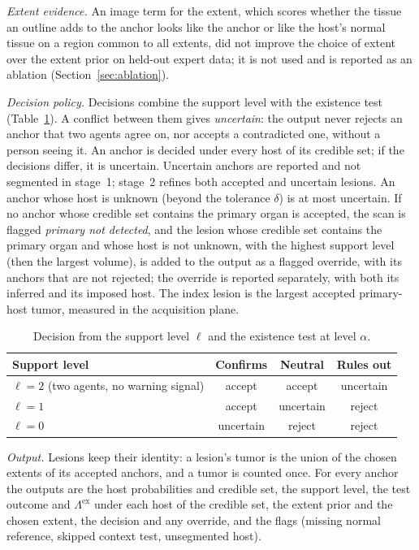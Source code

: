 \documentclass[fleqn,10pt]{olplainarticle}
\begin{document}
\emph{Extent evidence.} An image term for the extent, which scores whether the tissue an outline adds to the anchor
looks like the anchor or like the host's normal tissue on a region common to all extents, did not improve the choice of
extent over the extent prior on held-out expert data; it is not used and is reported as an ablation
(Section~\ref{sec:ablation}).

\emph{Decision policy.} Decisions combine the support level with the existence test (Table~\ref{tab:decision}). A
conflict between them gives \emph{uncertain}: the output never rejects an anchor that two agents agree on, nor accepts a
contradicted one, without a person seeing it. An anchor is decided under every host of its credible set; if the decisions
differ, it is uncertain. Uncertain anchors are reported and not segmented in stage~1; stage~2 refines both accepted and uncertain lesions. An
anchor whose host is unknown (beyond the tolerance $\delta$) is at most uncertain. If no anchor whose credible set
contains the primary organ is accepted, the scan is flagged \emph{primary not detected}, and the lesion whose credible set
contains the primary organ and whose host is not unknown, with the highest support level (then the largest volume), is added to the output as a flagged
override, with its anchors that are not rejected; the override is reported separately, with both its inferred and its
imposed host. The index lesion is the largest accepted primary-host tumor, measured in the acquisition plane.

\begin{table}[t]
\centering\small
\caption{Decision from the support level $\ell$ and the existence test at level $\alpha$.}
\label{tab:decision}
\begin{tabular}{lccc}
\hline
Support level & Confirms & Neutral & Rules out\\
\hline
$\ell=2$ (two agents, no warning signal) & accept & accept & uncertain\\
$\ell=1$ & accept & uncertain & reject\\
$\ell=0$ & uncertain & reject & reject\\
\hline
\end{tabular}
\end{table}

\emph{Output.} Lesions keep their identity: a lesion's tumor is the union of the chosen extents of its accepted anchors, and a
tumor is counted once. For every anchor the outputs are the host probabilities and credible set, the support level, the
test outcome and $\Lambda^{\mathrm{ex}}$ under each host of the credible set, the extent prior and the chosen extent, the
decision and any override, and the flags (missing normal reference, skipped context test, unsegmented host).
\end{document}
